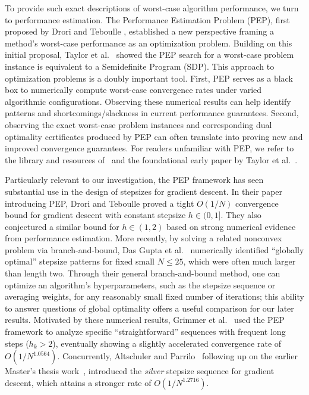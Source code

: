 \documentclass[11pt]{article}
\numberwithin{equation}{section}
\theoremstyle{definition}
\theoremstyle{definition}
\theoremstyle{definition}
\newcommand{\1}{\mathbf{1}}
\begin{document}
To provide such exact descriptions of worst-case algorithm performance, we turn to performance estimation. The Performance Estimation Problem (PEP), first proposed by Drori and Teboulle \cite{FirstPEP}, established a new perspective framing a method's worst-case performance as an optimization problem. Building on this initial proposal, Taylor et al.~\cite{Interpolation} showed the PEP search for a worst-case problem instance is equivalent to a Semidefinite Program (SDP). This approach to optimization problems is a doubly important tool. First, PEP serves as a black box to numerically compute worst-case convergence rates under varied algorithmic configurations. Observing these numerical results can help identify patterns and shortcomings/slackness in current performance guarantees. Second, observing the exact worst-case problem instances and corresponding dual optimality certificates produced by PEP can often translate into proving new and improved convergence guarantees. For readers unfamiliar with PEP, we refer to the library and resources of~\cite{pepit2022} and the foundational early paper by Taylor et al.~\cite{Interpolation2}.

Particularly relevant to our investigation, the PEP framework has seen substantial use in the design of stepsizes for gradient descent. In their paper introducing PEP, Drori and Teboulle proved a tight $O(1/N)$ convergence bound \cite[Theorem 3.1]{FirstPEP} for gradient descent with constant stepsize $h\in(0,1]$. They also conjectured a similar bound \cite[Conjecture 3.1]{FirstPEP} for $h\in (1,2)$ based on strong numerical evidence from performance estimation. More recently, by solving a related nonconvex problem via branch-and-bound, Das Gupta et al.~\cite{BnB} numerically identified ``globally optimal'' stepsize patterns for fixed small $N\leq 25$, which were often much larger than length two. Through their general branch-and-bound method, one can optimize an algorithm's hyperparameters, such as the stepsize sequence or averaging weights, for any reasonably small fixed number of iterations; this ability to answer questions of global optimality offers a useful comparison for our later results. Motivated by these numerical results, Grimmer et al.~\cite{Grimmer_LongStep,Grimmer_Accel} used the PEP framework to analyze specific ``straightforward'' sequences with frequent long steps ($h_k>2$), eventually showing a slightly accelerated convergence rate of $O\left(1/N^{1.0564}\right)$. Concurrently,  Altschuler and Parrilo~\cite{Silver_Accel} following up on the earlier Master's thesis work~\cite{altschuler2018greed}, introduced the \textit{silver} stepsize sequence for gradient descent, which attains a stronger rate of $O\left(1/N^{1.2716}\right)$.
\end{document}
